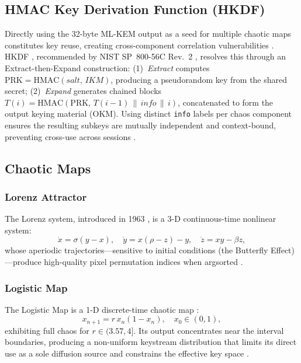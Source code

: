 \documentclass[conference]{IEEEtran}
\begin{document}
\subsection{HMAC Key Derivation Function (HKDF)}

Directly using the 32-byte ML-KEM output as a seed for multiple chaotic maps constitutes key reuse, creating cross-component correlation vulnerabilities \cite{b19}. HKDF \cite{b8}, recommended by NIST SP~800-56C Rev.~2 \cite{b7}, resolves this through an Extract-then-Expand construction: (1)~\textit{Extract} computes $\mathrm{PRK} = \mathrm{HMAC}(\mathit{salt},\,\mathit{IKM})$, producing a pseudorandom key from the shared secret; (2)~\textit{Expand} generates chained blocks $T(i) = \mathrm{HMAC}(\mathrm{PRK},\,T(i{-}1)\,\|\,\mathit{info}\,\|\,i)$, concatenated to form the output keying material (OKM). Using distinct \texttt{info} labels per chaos component ensures the resulting subkeys are mutually independent and context-bound, preventing cross-use across sessions \cite{b19}.

\subsection{Chaotic Maps}

\subsubsection{Lorenz Attractor}
The Lorenz system, introduced in 1963 \cite{b28}, is a 3-D continuous-time nonlinear system:
\begin{equation}
	\dot{x} = \sigma(y-x),\quad \dot{y} = x(\rho-z)-y,\quad \dot{z} = xy-\beta z,
	\label{eq:lorenz_bg}
\end{equation}
whose aperiodic trajectories---sensitive to initial conditions (the Butterfly Effect)---produce high-quality pixel permutation indices when argsorted \cite{b29}.

\subsubsection{Logistic Map}
The Logistic Map is a 1-D discrete-time chaotic map \cite{b11}:
\begin{equation}
	x_{n+1} = r\,x_n(1-x_n), \quad x_0 \in (0,1),
	\label{eq:logistic_bg}
\end{equation}
exhibiting full chaos for $r \in (3.57, 4]$. Its output concentrates near the interval boundaries, producing a non-uniform keystream distribution that limits its direct use as a sole diffusion source and constrains the effective key space \cite{b25}.
\end{document}
